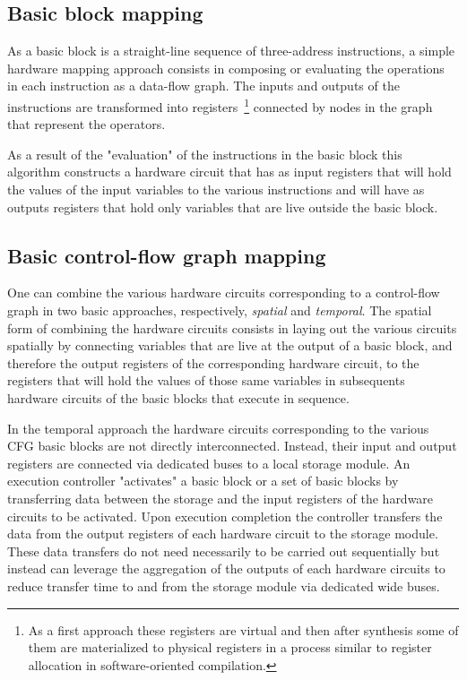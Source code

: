 \subsection{Basic block mapping}
As a basic block is a straight-line sequence of three-address instructions, a simple hardware mapping approach consists in composing or evaluating the operations in each instruction as a data-flow graph. 
The inputs and outputs of the instructions are transformed into registers~\footnote{As a first approach these registers are virtual and then after synthesis some of them are materialized to physical registers in a process similar to register allocation in software-oriented compilation.}  connected by nodes in the graph that represent the operators. 

As a result of the "evaluation" of the instructions in the basic block this algorithm constructs a hardware circuit that has as input registers that will hold the values of the input variables to the various instructions and will have as outputs registers that hold only variables that are live outside the basic block. 


\subsection{Basic control-flow graph mapping}
\label{sec:cfg_mapping}
One can combine the various hardware circuits corresponding to a control-flow graph in two basic approaches, respectively, {\em spatial} and {\em temporal}. 
The spatial form of combining the hardware circuits consists in laying out the various circuits spatially by connecting variables that are live at the output of a basic block, and therefore the output registers of the corresponding hardware circuit, to the registers that will hold the values of those same variables in subsequents hardware circuits of the basic blocks that execute in sequence.

In the temporal approach the hardware circuits corresponding to the various CFG basic blocks are not directly interconnected. 
Instead, their input and output registers are connected via dedicated buses to a local storage module. 
An execution controller "activates" a basic block or a set of basic blocks by transferring data between the storage and the input registers of the hardware circuits to be activated. 
Upon execution completion the controller transfers the data from the output registers of each hardware circuit to the storage module. 
These data transfers do not need necessarily to be carried out sequentially but instead can leverage the aggregation of the outputs of each hardware circuits to reduce transfer time to and from the storage module via dedicated wide buses.

